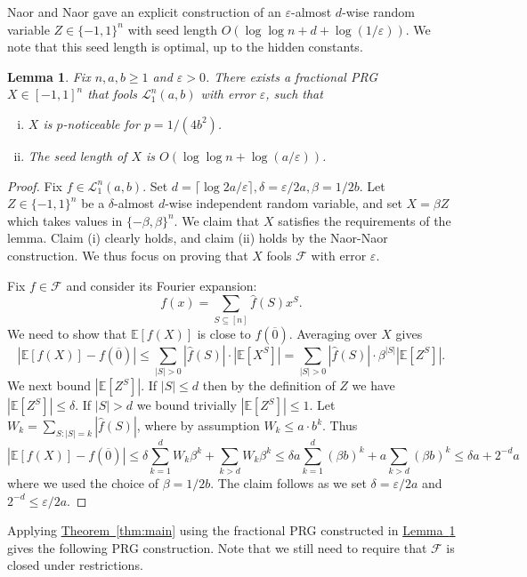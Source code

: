 \documentclass[11pt]{article}
\numberwithin{equation}{section}
\newtheorem{lemma}[theorem]{Lemma}
\theoremstyle{definition}
\theoremstyle{plain}
\newcommand{\expref}[2]{\hyperref[#2]{#1~\ref{#2}}}
\newcommand{\E}{\mathbb{E}}
\newcommand{\FF}{\mathcal{F}}
\newcommand{\LL}{\mathcal{L}}
\newcommand{\eps}{\varepsilon}
\newcommand{\zero}{\overline{0}}
\begin{document}
Naor and Naor \cite{naor1993small} gave an explicit construction of an $\eps$-almost $d$-wise random variable
$Z \in \{-1,1\}^n$ with seed length $O(\log\log n +  d + \log(1/\eps))$. We note that this seed length is optimal, up to the hidden constants.

\begin{lemma}\label{lemma:L1}
Fix $n,a,b \ge 1$ and $\eps>0$. There exists a fractional PRG $X \in [-1,1]^n$ that fools $\LL_1^n(a,b)$
with error $\eps$, such that
\begin{enumerate}[(i)]
\item $X$ is $p$-noticeable for $p={1}/{(4 b^2)}$.
\item The seed length of $X$ is $O(\log \log n + \log(a/\eps))$.
\end{enumerate}
\end{lemma}

\begin{proof}
Fix $f \in \LL_1^n(a,b)$.
Set $d=\lceil \log 2a/ \eps \rceil, \delta=\eps/2a, \beta=1/2b$. Let $Z \in \{-1,1\}^n$ be a $\delta$-almost $d$-wise independent random variable,
and set $X=\beta Z$ which takes values in $\{-\beta,\beta\}^n$. We claim that $X$ satisfies the requirements of the lemma. Claim (i) clearly holds, and claim (ii) holds by the Naor-Naor construction. We thus focus on proving that $X$ fools $\FF$ with error $\eps$.

Fix $f \in \FF$ and consider its Fourier expansion:
$$
f(x) = \sum_{S \subseteq [n]} \widehat{f}(S)  x^S.
$$
We need to show that $\E[f(X)]$ is close to $f(\zero)$. Averaging over $X$ gives
$$
|\E[f(X)]-f(\zero)| \le \sum_{|S|>0} |\widehat{f}(S)| \cdot |\E[X^S]| =
\sum_{|S|>0} |\widehat{f}(S)| \cdot \beta^{|S|} |\E[Z^S]|.
$$
We next bound $|\E[Z^S]|$. If $|S| \le d$ then by the definition of $Z$
we have $|\E[Z^S]| \le \delta$. If $|S|>d$ we bound trivially $|\E[Z^S]| \le 1$. Let $W_k = \sum_{S: |S|=k } |\hat{f}(S)|$, where by assumption $W_k \le a \cdot b^k$. Thus
$$
|\E[f(X)]-f(\zero)| \le \delta \sum_{k=1}^d W_k \beta^k + \sum_{k>d} W_k \beta^k \le  \delta a \sum_{k=1}^d (\beta b)^k + a \sum_{k>d} (\beta b)^k \le \delta a + 2^{-d} a
$$
where we used the choice of $\beta = 1/2b$. The claim follows as we set $\delta=\eps/2a $ and $2^{-d} \le \eps/2a$.
\end{proof}

Applying \expref{Theorem}{thm:main} using the fractional PRG constructed in \expref{Lemma}{lemma:L1} gives the following PRG construction. Note that
we still need to require that $\FF$ is closed under restrictions.
\end{document}
